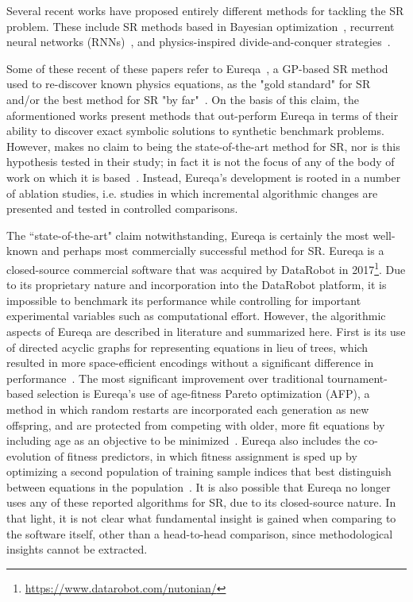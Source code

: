 Several recent works have proposed entirely different methods for tackling the SR problem. 
These include SR methods based in Bayesian optimization~\cite{jinBayesianSymbolicRegression2020}, recurrent neural networks (RNNs)~\cite{petersenDeepSymbolicRegression2020}, and physics-inspired divide-and-conquer strategies~\cite{udrescuAIFeynmanPhysicsInspired2020,udrescuAIFeynmanParetooptimal2020}. 

Some of these recent of these papers refer to Eureqa~\cite{schmidtDistillingFreeformNatural2009b}, a GP-based SR method used to re-discover known physics equations, as the "gold standard" for SR~\cite{petersenDeepSymbolicRegression2020} and/or the best method for SR "by far"~\cite{udrescuAIFeynmanPhysicsInspired2020}. 
On the basis of this claim, the aformentioned works present methods that out-perform Eureqa in terms of their ability to discover exact symbolic solutions to synthetic benchmark problems. 
However, \citet{schmidtDistillingFreeformNatural2009b} makes no claim to being the state-of-the-art method for SR, nor is this hypothesis tested in their study; in fact it is not the focus of any of the body of work on which it is based~\cite{schmidtMachineScienceAutomated2011}.  
Instead, Eureqa's development is rooted in a number of ablation studies, i.e. studies in which incremental algorithmic changes are presented and tested in controlled comparisons. 

The ``state-of-the-art" claim notwithstanding, Eureqa is certainly the most well-known and perhaps most commercially successful method for SR. 
Eureqa is a closed-source commercial software that was acquired by DataRobot in 2017\footnote{\url{https://www.datarobot.com/nutonian/}}. 
Due to its proprietary nature and incorporation into the DataRobot platform, it is impossible to benchmark its performance while controlling for important experimental variables such as computational effort. 
However, the algorithmic aspects of Eureqa are described in literature and summarized here. 
First is its use of directed acyclic graphs for representing equations in lieu of trees, which resulted in more space-efficient encodings without a significant difference in performance~\cite{schmidtComparisonTreeGraph2007}. 
The most significant improvement over traditional tournament-based selection is Eureqa's use of age-fitness Pareto optimization (AFP), a method in which random restarts are incorporated each generation as new offspring, and are protected from competing with older, more fit equations by including age as an objective to be minimized~\cite{schmidtAgefitnessParetoOptimization2011}. 
Eureqa also includes the co-evolution of fitness predictors, in which fitness assignment is sped up by optimizing a second population of training sample indices that best distinguish between equations in the population~\cite{schmidtCoevolutionFitnessPredictors2008}.
It is also possible that Eureqa no longer uses any of these reported algorithms for SR, due to its closed-source nature.
In that light, it is not clear what fundamental insight is gained when comparing to the software itself, other than a head-to-head comparison, since methodological insights cannot be extracted.

